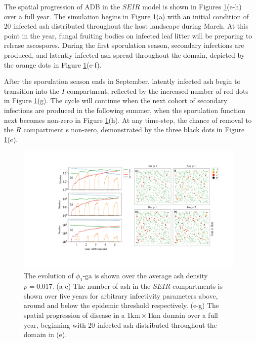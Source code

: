 The spatial progression of ADB in the $SEIR$ model is shown in Figures \ref{fig:SEIR-spread}(e-h) over a full year. 
The simulation begins in Figure \ref{fig:SEIR-spread}(a) with an initial condition of $20$ infected ash distributed throughout the host landscape during March. 
At this point in the year, fungal fruiting bodies on infected leaf litter will be preparing to release ascospores.
During the first sporulation season, secondary infections are produced, and latently infected ash spread throughout the domain, depicted by the orange dots in Figure \ref{fig:SEIR-spread}(e-f). 

After the sporulation season ends in September, latently infected ash begin to transition into the $I$ compartment, reflected by the increased number of red dots in Figure \ref{fig:SEIR-spread}(g). 
The cycle will continue when the next cohort of secondary infections are produced in the following summer, when the sporulation function next becomes non-zero in Figure \ref{fig:SEIR-spread}(h).
At any time-step, the chance of removal to the $R$ compartment s non-zero, demonstrated by the three black dots in Figure \ref{fig:SEIR-spread}(c).

\begin{landscape}
\begin{figure}
    \centering
    \includegraphics[scale=0.45]{chapter6/figures/fig4-seir.pdf} %
     \caption{The evolution of $\phi_1$-ga is shown over the average ash density $\overline{\rho} = 0.017$. (a-c) The number of ash in the $SEIR$ compartments is shown over five years for arbitrary infectivity parameters above, around and below the epidemic threshold respectively. (e-g) The spatial progression of disease in a $1\mathrm{km} \times 1\mathrm{km}$ domain over a full year, beginning with $20$ infected ash distributed throughout the domain in (e).}
    \label{fig:SEIR-spread}
\end{figure}
\end{landscape}

